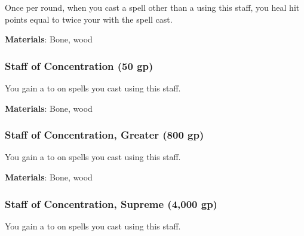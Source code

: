 Once per round, when you cast a spell other than a  using this staff,
you heal hit points equal to twice your  with the spell cast.



\vspace{0.25em}
\textbf{Materials}: Bone, wood


\lowercase{\hypertarget{item:Staff of Concentration}{}}\label{item:Staff of Concentration}
\hypertarget{item:Staff of Concentration}{\subsubsection{Staff of Concentration\hfill{} (50 gp)}}

You gain a   to  on spells you cast using this staff.



\vspace{0.25em}
\textbf{Materials}: Bone, wood


\lowercase{\hypertarget{item:Staff of Concentration, Greater}{}}\label{item:Staff of Concentration, Greater}
\hypertarget{item:Staff of Concentration, Greater}{\subsubsection{Staff of Concentration, Greater\hfill{} (800 gp)}}

You gain a   to  on spells you cast using this staff.



\vspace{0.25em}
\textbf{Materials}: Bone, wood


\lowercase{\hypertarget{item:Staff of Concentration, Supreme}{}}\label{item:Staff of Concentration, Supreme}
\hypertarget{item:Staff of Concentration, Supreme}{\subsubsection{Staff of Concentration, Supreme\hfill{} (4,000 gp)}}

You gain a   to  on spells you cast using this staff.




